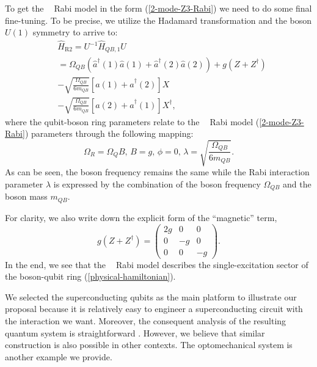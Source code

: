 \documentclass[reprint, aps, prx, amsmath, amssymb, longbibliography, superscriptaddress]{revtex4-2}
\DeclareMathOperator{\Zthree}{\mathbb{Z}_3}
\begin{document}
To get the $\Zthree$ Rabi model in the form (\ref{2-mode-Z3-Rabi}) we need to do some final fine-tuning. To be precise, we utilize the Hadamard transformation and the boson $U(1)$ symmetry to arrive to:
\begin{equation}
\label{effective-rabi}
\begin{aligned}
    &\hat H_{\text{R}2} = U^{-1} \hat H_{QB,1} U  \\
    &=\Omega_{QB} (\hat a^{\dagger}(1) \hat a(1) + \hat a^{\dagger}(2) \hat a(2)) + g (Z + Z^{\dagger}) \\
    & - \sqrt{\frac{\Omega_{QB}}{6m_{QB}}} \left[\hat a(1) + \hat a^{\dagger}(2)\right] X \\
    &- \sqrt{\frac{\Omega_{QB}}{6m_{QB}}} \left[\hat a(2) + \hat a^{\dagger}(1)\right] X^{\dagger},
\end{aligned}
\end{equation}
where the qubit-boson ring parameters relate to the $\Zthree$ Rabi model (\ref{2-mode-Z3-Rabi}) parameters through the following mapping:
\begin{equation}
\label{QB-RM-parameter-mapping}
  \Omega_R = \Omega_QB, \, B = g, \,  \phi = 0, \,\lambda = \sqrt{\frac{\Omega_{QB}}{6m_{QB}}}.
\end{equation}
As can be seen, the boson frequency remains the same while the Rabi interaction parameter $\lambda$ is expressed by the combination of the boson frequency $\Omega_{QB}$ and the boson mass $m_{QB}$.

For clarity, we also write down the explicit form of the ``magnetic'' term,
\begin{equation}
\label{superconducting-magnetic-term}
  g (Z + Z^{\dagger}) = \begin{pmatrix}
      2 g & 0 & 0 \\
      0 & -g & 0 \\
      0 & 0 & -g
  \end{pmatrix}.   
\end{equation}
In the end, we see that the $\Zthree$ Rabi model describes the single-excitation sector of the boson-qubit ring (\ref{physical-hamiltonian}).

We selected the superconducting qubits as the main platform to illustrate our proposal because it is relatively easy to engineer a superconducting circuit with the interaction we want. Moreover, the consequent analysis of the resulting quantum system is straightforward \cite{yurke_quantum_1984, devoret_quantum_1997,wendin_superconducting_2005}. However, we believe that similar construction is also possible in other contexts. The optomechanical system is another example we provide.
\end{document}

